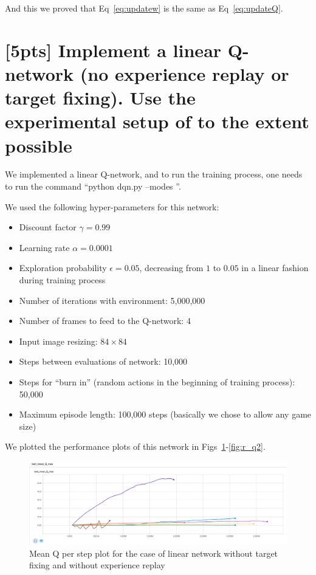 \documentclass{article}
\begin{document}
And this we proved that Eq~\ref{eq:updatew} is the same as Eq~\ref{eq:updateQ}.

\section{[5pts] Implement a linear Q-network (no experience replay or target fixing). Use the experimental setup of \cite{mnih2013playing,mnih2015human} to the extent possible}

We implemented a linear Q-network, and to run the training process, one needs to run the command ``python dqn.py --modes ''.

We used the following hyper-parameters for this network:
\begin{itemize}
  \item Discount factor $\gamma=0.99$
  \item Learning rate $\alpha=0.0001$
  \item Exploration probability $\epsilon=0.05$, decreasing from $1$ to $0.05$ in a linear fashion during training process
  \item Number of iterations with environment: 5,000,000
  \item Number of frames to feed to the Q-network: 4
  \item Input image resizing: $84\times84$
  \item Steps between evaluations of network: 10,000
  \item Steps for ``burn in'' (random actions in the beginning of training process): 50,000
  \item Maximum episode length: 100,000 steps (basically we chose to allow any game size)
\end{itemize}

We plotted the performance plots of this network in Figs~\ref{fig:q_q2}-\ref{fig:r_q2}.

\begin{figure}[ht] \label{fig:q_q2}
  \centering
  \includegraphics[width=1.0\textwidth]{images/q_linearWithoutStuff}
  \caption{Mean Q per step plot for the case of linear network without target fixing and without experience replay}
\end{figure}
\end{document}
